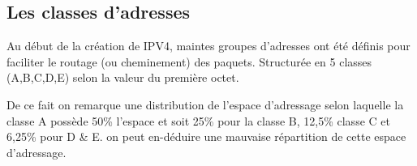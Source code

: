 \subsection{Les classes d’adresses}
Au début de la création de IPV4, maintes groupes d’adresses ont été définis
pour faciliter le routage (ou cheminement) des paquets. Structurée en 5 classes
(A,B,C,D,E) selon la valeur du première octet.


De ce fait on remarque une distribution de l’espace d’adressage selon laquelle
la classe A possède 50\% l’espace et soit 25\% pour la classe B, 12,5\% classe
C et 6,25\% pour D & E. on peut en-déduire une mauvaise répartition de cette
espace d’adressage. 

